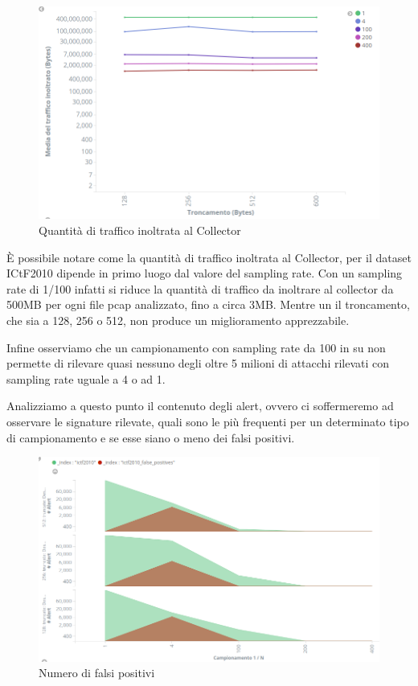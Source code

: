 \documentclass[12pt,a4paper,openright,twoside]{report}
\begin{document}
\begin{figure}[h!]
\begin{center}                          %
  \includegraphics[width=\textwidth]{images/ICTF-trunc-vs-traffic.png}
  \caption{Quantit\`a di traffico inoltrata al Collector}
  \label{}
\end{center}
\end{figure}

\`E possibile notare come la quantit\`a di traffico inoltrata al Collector,
per il dataset ICtF2010 dipende in primo luogo dal valore del sampling rate.
Con un sampling rate di 1/100 infatti si riduce la quantit\`a di traffico da inoltrare al
collector da 500MB per ogni file pcap analizzato, fino a circa 3MB.
Mentre un il troncamento, che sia a 128, 256 o 512, non produce un miglioramento apprezzabile.

Infine osserviamo che  un campionamento con sampling rate da 100 in su non permette
di rilevare quasi nessuno degli oltre 5 milioni di attacchi rilevati con
sampling rate uguale a 4 o ad 1.

Analizziamo a questo punto il contenuto degli alert, ovvero ci soffermeremo ad osservare le signature
rilevate, quali sono le pi\`u frequenti per un determinato tipo di campionamento e
se esse siano o meno dei falsi positivi.

\begin{figure}[h!]
\begin{center}                          %
  \includegraphics[width=\textwidth]{images/ICTF-false-positives-mul.png}
  \caption{Numero di falsi positivi}
  \label{}
\end{center}
\end{figure}
\end{document}
